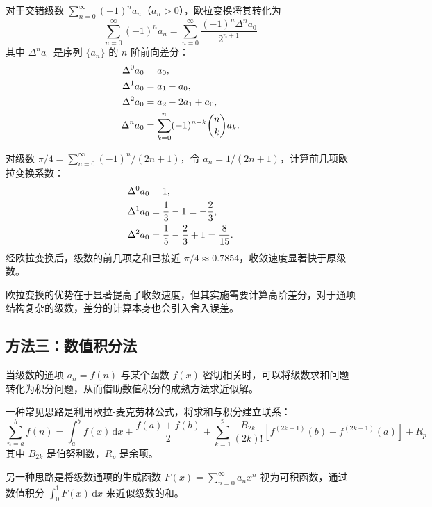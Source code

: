 对于交错级数 $\displaystyle \sum_{n=0}^{\infty} (-1)^n a_n$（$a_n > 0$），欧拉变换将其转化为
\begin{equation}
\sum_{n=0}^{\infty} (-1)^n a_n = \sum_{n=0}^{\infty} \frac{(-1)^n \Delta^n a_0}{2^{n+1}}
\end{equation}
其中 $\Delta^n a_0$ 是序列 $\{a_n\}$ 的 $n$ 阶前向差分：
\begin{align}
\Delta^0 a_0 &= a_0, \notag\\
\Delta^1 a_0 &= a_1 - a_0, \notag\\
\Delta^2 a_0 &= a_2 - 2a_1 + a_0, \notag\\
\Delta^n a_0 &= \sum_{k=0}^{n} (-1)^{n-k} \binom{n}{k} a_k. \notag
\end{align}

\begin{example}[欧拉变换加速莱布尼兹公式]
对级数 $\displaystyle \pi/4 = \sum_{n=0}^{\infty} (-1)^n/(2n+1)$，令 $a_n = 1/(2n+1)$，计算前几项欧拉变换系数：
\begin{align}
\Delta^0 a_0 &= 1, \notag\\
\Delta^1 a_0 &= \frac{1}{3} - 1 = -\frac{2}{3}, \notag\\
\Delta^2 a_0 &= \frac{1}{5} - \frac{2}{3} + 1 = \frac{8}{15}. \notag
\end{align}
经欧拉变换后，级数的前几项之和已接近 $\pi/4 \approx 0.7854$，收敛速度显著快于原级数。
\end{example}

欧拉变换的优势在于显著提高了收敛速度，但其实施需要计算高阶差分，对于通项结构复杂的级数，差分的计算本身也会引入舍入误差。

\subsection{方法三：数值积分法}

当级数的通项 $a_n = f(n)$ 与某个函数 $f(x)$ 密切相关时，可以将级数求和问题转化为积分问题，从而借助数值积分的成熟方法求近似解。

一种常见思路是利用欧拉-麦克劳林公式，将求和与积分建立联系：
\begin{equation}
\sum_{n=a}^{b} f(n) = \int_a^b f(x)\, \mathrm{d}x + \frac{f(a)+f(b)}{2} + \sum_{k=1}^{p} \frac{B_{2k}}{(2k)!}\left[f^{(2k-1)}(b) - f^{(2k-1)}(a)\right] + R_p
\end{equation}
其中 $B_{2k}$ 是伯努利数，$R_p$ 是余项。

另一种思路是将级数通项的生成函数 $\displaystyle F(x) = \sum_{n=0}^{\infty} a_n x^n$ 视为可积函数，通过数值积分 $\displaystyle \int_0^1 F(x)\, \mathrm{d}x$ 来近似级数的和。

